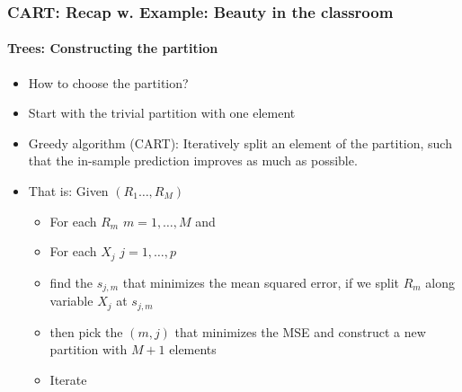 \documentclass[
  shownotes,
  xcolor={svgnames},
  hyperref={colorlinks,citecolor=DarkBlue,linkcolor=DarkRed,urlcolor=DarkBlue}
  , aspectratio=169]{beamer}
\begin{document}
\begin{frame}[fragile]
\frametitle{CART: Recap w. Example: Beauty in the classroom}
\framesubtitle{Trees: Constructing the partition}


\begin{itemize}
 \item How to choose the partition?
 \item Start with the trivial partition with one element
 \item  Greedy algorithm (CART): Iteratively split an element of the partition, such that the in-sample prediction improves as much as possible.
 \item That is: Given $(R_1\dots,R_M)$
 \begin{itemize}
  \item For each $R_m$ $m=1,\dots,M$ and
  \item For each $X_j$ $j=1,\dots,p$
  \item find the $s_{j,m}$ that minimizes the mean squared error, if we split $R_m$ along variable $X_j$ at $s_{j,m}$
  \item then pick the $(m,j)$ that minimizes the MSE and construct a new partition with $M+1$ elements
  \item Iterate
 \end{itemize}
 
\end{itemize}
\end{frame}
\end{document}
